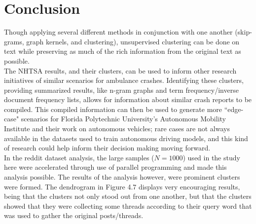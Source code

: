 %
%
%

\chapter{Conclusion}

\hspace*{0.3cm} Though applying several different methods in conjunction with one another (skip-grams, graph kernels, and clustering), unsupervised clustering can be done on text while preserving as much of the rich information from the original text as possible. \\

The NHTSA results, and their clusters, can be used to inform other research initiatives of similar scenarios for ambulance crashes. Identifying these clusters, providing summarized results, like n-gram graphs and term frequency/inverse document frequency lists, allows for information about similar crash reports to be compiled. This compiled information can then be used to generate more ``edge-case" scenarios for Florida Polytechnic University's Autonomous Mobility Institute and their work on autonomous vehicles; rare cases are not always available in the datasets used to train autonomous driving models, and this kind of research could help inform their decision making moving forward.\\

In the reddit dataset analysis, the large samples ($N=1000$) used in the study here were accelerated through use of parallel programming and made this analysis possible. The results of the analysis however, were prominent clusters were formed. The dendrogram in Figure 4.7 displays very encouraging results, being that the clusters not only stood out from one another, but that the clusters showed that they were collecting some threads according to their query word that was used to gather the original posts/threads. \\

